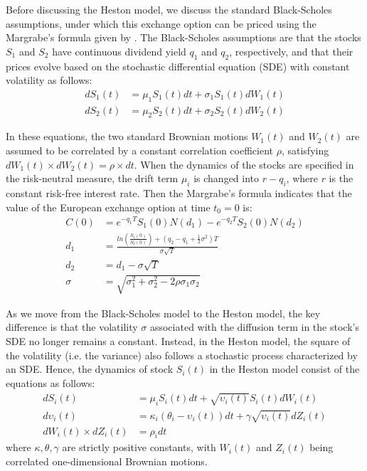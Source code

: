 \documentclass{article}
\begin{document}
    Before discussing the Heston model, we discuss the standard Black-Scholes assumptions, under which this exchange option can be priced using the Margrabe's formula given by \cite{margrabe78}. The Black-Scholes assumptions are that the stocks $S_1$ and $S_2$ have continuous dividend yield $q_1$ and $q_2$, respectively, and that their prices evolve based on the stochastic differential equation (SDE) with constant volatility as follows:
	\begin{align*}
	dS_1(t) &= \mu_1 S_1(t) dt + \sigma_1 S_1(t) dW_1(t) \\
	dS_2(t) &= \mu_2 S_2(t) dt + \sigma_2 S_2(t) dW_2(t)
	\end{align*}	
	
	In these equations, the two standard Brownian motions $W_1(t)$ and $W_2(t)$ are assumed to be correlated by a constant correlation coefficient $\rho$, satisfying $dW_1(t) \times dW_2(t) = \rho \times dt$. When the dynamics of the stocks are specified in the risk-neutral measure, the drift term $\mu_i$ is changed into $r-q_i$, where $r$ is the constant risk-free interest rate. Then the Margrabe's formula indicates that the value of the European exchange option at time $t_0=0$ is:
	\begin{align*}
	C(0) &= e^{-q_1 T} S_1(0) N(d_1) - e^{-q_2 T} S_2(0) N(d_2) \\
	d_1 &= \frac{ln(\frac{S_1(0)}{S_2(0)}) + (q_2 - q_1 + \frac{1}{2} \sigma^2) T}{\sigma \sqrt{T}} \\
	d_2 &= d_1 - \sigma \sqrt{T} \\
	\sigma &= \sqrt{\sigma_1^2 + \sigma_2^2 - 2 \rho \sigma_1 \sigma_2}
	\end{align*}	
	
	As we move from the Black-Scholes model to the Heston model, the key difference is that the volatility $\sigma$ associated with the diffusion term in the stock's SDE no longer remains a constant. Instead, in the Heston model, the square of the volatility (i.e. the variance) also follows a stochastic process characterized by an SDE. Hence, the dynamics of stock $S_i(t)$ in the Heston model consist of the equations as follows:
	\begin{align*}
	dS_i(t) &= \mu_i S_i(t) dt + \sqrt{\upsilon_i(t)} S_i(t) dW_i(t) \\
	d\upsilon_i(t) &= \kappa_i (\theta_i - \upsilon_i(t)) dt + \gamma \sqrt{\upsilon_i(t)} dZ_i(t) \\
	dW_i(t) \times dZ_i(t) &= \rho_i dt
	\end{align*}
	where $\kappa, \theta, \gamma$ are strictly positive constants, with $W_i(t)$ and $Z_i(t)$ being correlated one-dimensional Brownian motions.
    
\end{document}
